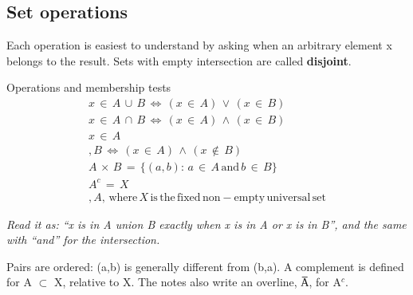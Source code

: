 \documentclass[11pt]{article}
\begin{document}
\begin{keepsection}
\begin{keepsection}
\subsection{Set operations}

Each operation is easiest to understand by asking when an arbitrary element x belongs to the result. Sets with empty intersection are called \textbf{disjoint}.

\begin{equationcard}{Operations and membership tests}
\[ \begin{gathered} {x}\, \in \, {A}\, \cup \, {B}\, \Leftrightarrow \, ({x}\, \in \, {A})\, \lor \, ({x}\, \in \, {B}) \\ {x}\, \in \, {A}\, \cap \, {B}\, \Leftrightarrow \, ({x}\, \in \, {A})\, \land \, ({x}\, \in \, {B}) \\ {x}\, \in \, {A}\, \\, {B}\, \Leftrightarrow \, ({x}\, \in \, {A})\, \land \, ({x}\, \notin \, {B}) \\ {A}\, \times \, {B}\, =\, \{({a},{b}):\, {a}\, \in \, {A}\, \text{and}\, {b}\, \in \, {B}\} \\ {A}^{c}\, =\, {X}\, \\, {A},\, \text{where}\, {X}\, \text{is}\, \text{the}\, \text{fixed}\, \text{non}-\text{empty}\, \text{universal}\, \text{set} \end{gathered} \]
{\small \emph{Read it as: “x is in A union B exactly when x is in A or x is in B”, and the same with “and” for the intersection.}\par Pairs are ordered: (a,b) is generally different from (b,a). A complement is defined for A \ensuremath{\subset} X, relative to X. The notes also write an overline, A̅, for A\ensuremath{^{c}}.}
\end{equationcard}


\end{keepsection}
\end{keepsection}
\end{document}
